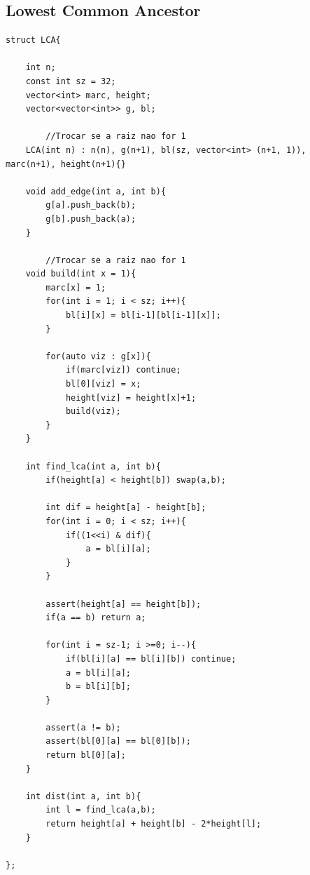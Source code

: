\documentclass[11pt, a4paper, twoside]{article}
\begin{document}
\subsection{Lowest Common Ancestor}
\begin{verbatim}
struct LCA{
        
    int n;
    const int sz = 32;
    vector<int> marc, height;
    vector<vector<int>> g, bl;
    
        //Trocar se a raiz nao for 1
    LCA(int n) : n(n), g(n+1), bl(sz, vector<int> (n+1, 1)), marc(n+1), height(n+1){}
    
    void add_edge(int a, int b){
        g[a].push_back(b);
        g[b].push_back(a);
    }
    
        //Trocar se a raiz nao for 1
    void build(int x = 1){ 
        marc[x] = 1;
        for(int i = 1; i < sz; i++){
            bl[i][x] = bl[i-1][bl[i-1][x]];
        }
    
        for(auto viz : g[x]){
            if(marc[viz]) continue;
            bl[0][viz] = x;
            height[viz] = height[x]+1;
            build(viz);
        }
    }
    
    int find_lca(int a, int b){
        if(height[a] < height[b]) swap(a,b);
    
        int dif = height[a] - height[b];
        for(int i = 0; i < sz; i++){
            if((1<<i) & dif){
                a = bl[i][a];
            }
        }
    
        assert(height[a] == height[b]);
        if(a == b) return a;
    
        for(int i = sz-1; i >=0; i--){
            if(bl[i][a] == bl[i][b]) continue;
            a = bl[i][a];
            b = bl[i][b];
        }
            
        assert(a != b);
        assert(bl[0][a] == bl[0][b]);
        return bl[0][a];
    }
    
    int dist(int a, int b){
        int l = find_lca(a,b);  
        return height[a] + height[b] - 2*height[l];
    }
    
};
\end{verbatim}
\end{document}
